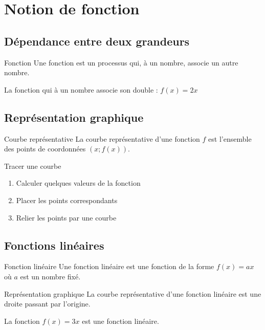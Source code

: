 \chapter{Notion de fonction}

\section{Dépendance entre deux grandeurs}
\begin{definition}{Fonction}
Une fonction est un processus qui, à un nombre, associe un autre nombre.
\end{definition}

\begin{exemple}
La fonction qui à un nombre associe son double : $f(x) = 2x$
\end{exemple}

\section{Représentation graphique}
\begin{definition}{Courbe représentative}
La courbe représentative d'une fonction $f$ est l'ensemble des points de coordonnées $(x; f(x))$.
\end{definition}

\begin{methode}{Tracer une courbe}
\begin{enumerate}
    \item Calculer quelques valeurs de la fonction
    \item Placer les points correspondants
    \item Relier les points par une courbe
\end{enumerate}
\end{methode}

\section{Fonctions linéaires}
\begin{definition}{Fonction linéaire}
Une fonction linéaire est une fonction de la forme $f(x) = ax$ où $a$ est un nombre fixé.
\end{definition}

\begin{propriete}{Représentation graphique}
La courbe représentative d'une fonction linéaire est une droite passant par l'origine.
\end{propriete}

\begin{exemple}
La fonction $f(x) = 3x$ est une fonction linéaire.
\end{exemple} 